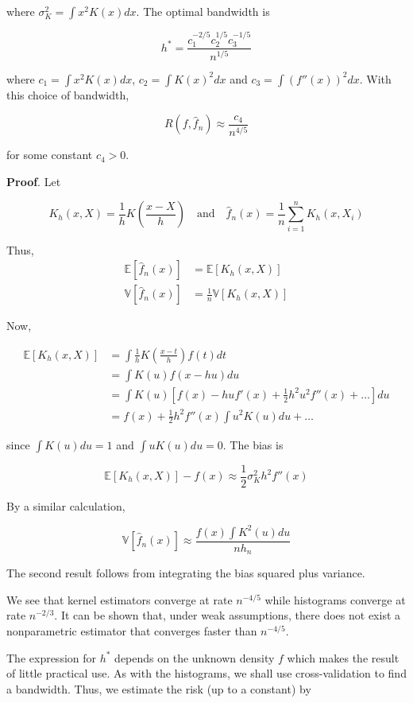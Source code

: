 where \(\sigma_K^2 = \int x^2 K(x) dx\). The optimal bandwidth is

\[ h^* = \frac{c_1^{-2/5} c_2^{1/5} c_3^{-1/5}}{n^{1/5}} \]

where \(c_1 = \int x^2 K(x) dx\), \(c_2 = \int K(x)^2 dx\) and
\(c_3 = \int \left( f''(x) \right)^2 dx\). With this choice of
bandwidth,

\[ R(f, \hat{f}_n) \approx \frac{c_4}{n^{4/5}} \]

for some constant \(c_4 > 0\).

\textbf{Proof}. Let

\[ K_h(x, X) = \frac{1}{h} K\left( \frac{x - X}{h} \right)
\quad \text{and} \quad
\hat{f}_n(x) = \frac{1}{n} \sum_{i=1}^n K_h(x, X_i)
\]

Thus, \[
\begin{align}
\mathbb{E}[\hat{f}_n(x)] &= \mathbb{E}[K_h(x, X)] \\
\mathbb{V}[\hat{f}_n(x)] &= \frac{1}{n} \mathbb{V}[K_h(x, X)]
\end{align}
\]

Now,

\[
\begin{align}
\mathbb{E}[K_h(x, X)] &= \int \frac{1}{h} K\left( \frac{x - t}{h} \right) f(t) dt \\
&= \int K(u) f(x - hu) du \\
&= \int K(u) \left[ f(x) - hu f'(x) + \frac{1}{2} h^2u^2 f''(x) + \dots \right] du \\
&= f(x) + \frac{1}{2} h^2 f''(x) \int u^2 K(u) du + \dots
\end{align}
\]

since \(\int K(u) du = 1\) and \(\int u K(u) du = 0\). The bias is

\[ \mathbb{E}[K_h(x, X)] - f(x) \approx \frac{1}{2} \sigma_K^2 h^2 f''(x) \]

By a similar calculation,

\[ \mathbb{V}[\hat{f}_n(x)] \approx \frac{f(x) \int K^2(u) du}{n h_n} \]

The second result follows from integrating the bias squared plus
variance.

We see that kernel estimators converge at rate \(n^{-4/5}\) while
histograms converge at rate \(n^{-2/3}\). It can be shown that, under
weak assumptions, there does not exist a nonparametric estimator that
converges faster than \(n^{-4/5}\).

The expression for \(h^*\) depends on the unknown density \(f\) which
makes the result of little practical use. As with the histograms, we
shall use cross-validation to find a bandwidth. Thus, we estimate the
risk (up to a constant) by

